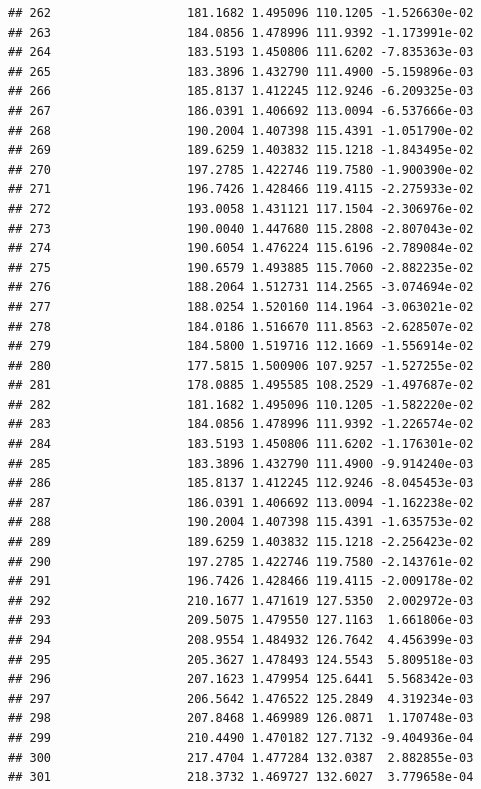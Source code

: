 \documentclass[
]{article}
\begin{document}
\begin{verbatim}
## 262                   181.1682 1.495096 110.1205 -1.526630e-02
## 263                   184.0856 1.478996 111.9392 -1.173991e-02
## 264                   183.5193 1.450806 111.6202 -7.835363e-03
## 265                   183.3896 1.432790 111.4900 -5.159896e-03
## 266                   185.8137 1.412245 112.9246 -6.209325e-03
## 267                   186.0391 1.406692 113.0094 -6.537666e-03
## 268                   190.2004 1.407398 115.4391 -1.051790e-02
## 269                   189.6259 1.403832 115.1218 -1.843495e-02
## 270                   197.2785 1.422746 119.7580 -1.900390e-02
## 271                   196.7426 1.428466 119.4115 -2.275933e-02
## 272                   193.0058 1.431121 117.1504 -2.306976e-02
## 273                   190.0040 1.447680 115.2808 -2.807043e-02
## 274                   190.6054 1.476224 115.6196 -2.789084e-02
## 275                   190.6579 1.493885 115.7060 -2.882235e-02
## 276                   188.2064 1.512731 114.2565 -3.074694e-02
## 277                   188.0254 1.520160 114.1964 -3.063021e-02
## 278                   184.0186 1.516670 111.8563 -2.628507e-02
## 279                   184.5800 1.519716 112.1669 -1.556914e-02
## 280                   177.5815 1.500906 107.9257 -1.527255e-02
## 281                   178.0885 1.495585 108.2529 -1.497687e-02
## 282                   181.1682 1.495096 110.1205 -1.582220e-02
## 283                   184.0856 1.478996 111.9392 -1.226574e-02
## 284                   183.5193 1.450806 111.6202 -1.176301e-02
## 285                   183.3896 1.432790 111.4900 -9.914240e-03
## 286                   185.8137 1.412245 112.9246 -8.045453e-03
## 287                   186.0391 1.406692 113.0094 -1.162238e-02
## 288                   190.2004 1.407398 115.4391 -1.635753e-02
## 289                   189.6259 1.403832 115.1218 -2.256423e-02
## 290                   197.2785 1.422746 119.7580 -2.143761e-02
## 291                   196.7426 1.428466 119.4115 -2.009178e-02
## 292                   210.1677 1.471619 127.5350  2.002972e-03
## 293                   209.5075 1.479550 127.1163  1.661806e-03
## 294                   208.9554 1.484932 126.7642  4.456399e-03
## 295                   205.3627 1.478493 124.5543  5.809518e-03
## 296                   207.1623 1.479954 125.6441  5.568342e-03
## 297                   206.5642 1.476522 125.2849  4.319234e-03
## 298                   207.8468 1.469989 126.0871  1.170748e-03
## 299                   210.4490 1.470182 127.7132 -9.404936e-04
## 300                   217.4704 1.477284 132.0387  2.882855e-03
## 301                   218.3732 1.469727 132.6027  3.779658e-04

\end{verbatim}
\end{document}
